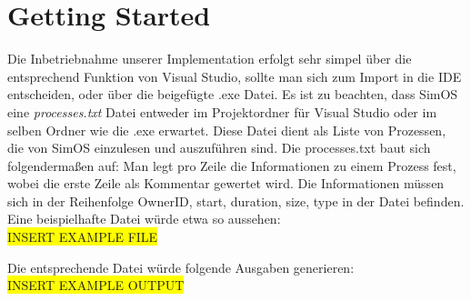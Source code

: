 \section{Getting Started}
Die Inbetriebnahme unserer Implementation erfolgt sehr simpel über die entsprechend Funktion von Visual Studio, sollte man sich zum Import in die IDE entscheiden, oder über die beigefügte .exe Datei.
Es ist zu beachten, dass SimOS eine \textit{processes.txt} Datei entweder im Projektordner für Visual Studio oder im selben Ordner wie die .exe erwartet. Diese Datei dient als Liste von Prozessen, die von SimOS einzulesen und auszuführen sind.
Die processes.txt baut sich folgendermaßen auf: Man legt pro Zeile die Informationen zu einem Prozess fest, wobei die erste Zeile als Kommentar gewertet wird. Die Informationen müssen sich in der Reihenfolge OwnerID, start, duration, size, type in der Datei befinden.
Eine beispielhafte Datei würde etwa so aussehen: \\
\colorbox{yellow}{INSERT EXAMPLE FILE}

Die entsprechende Datei würde folgende Ausgaben generieren:\\
\colorbox{yellow}{INSERT EXAMPLE OUTPUT}
